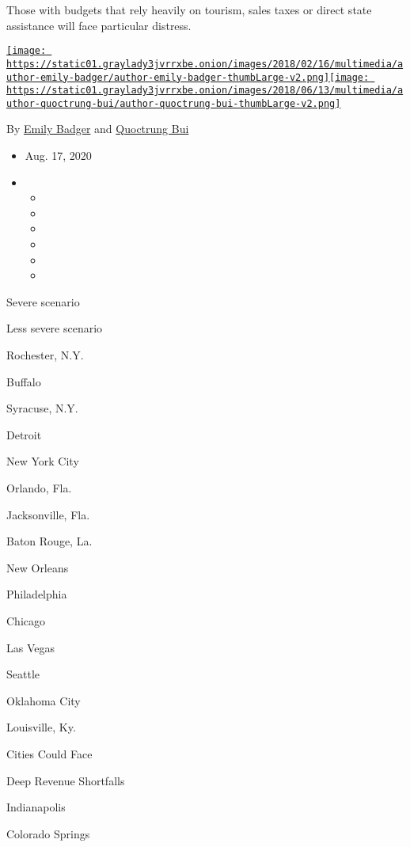 Those with budgets that rely heavily on tourism, sales taxes or direct
state assistance will face particular distress.

\href{https://www.nytimes3xbfgragh.onion/by/emily-badger}{\texttt{[image: https://static01.graylady3jvrrxbe.onion/images/2018/02/16/multimedia/author-emily-badger/author-emily-badger-thumbLarge-v2.png]}}\href{https://www.nytimes3xbfgragh.onion/by/quoctrung-bui}{\texttt{[image: https://static01.graylady3jvrrxbe.onion/images/2018/06/13/multimedia/author-quoctrung-bui/author-quoctrung-bui-thumbLarge-v2.png]}}

By \href{https://www.nytimes3xbfgragh.onion/by/emily-badger}{Emily
Badger} and
\href{https://www.nytimes3xbfgragh.onion/by/quoctrung-bui}{Quoctrung
Bui}

\begin{itemize}
\item
  Aug. 17, 2020
\item
  \begin{itemize}
  \item
  \item
  \item
  \item
  \item
  \item
  \end{itemize}
\end{itemize}

Severe scenario

Less severe scenario

Rochester, N.Y.

Buffalo

Syracuse, N.Y.

Detroit

New York City

Orlando, Fla.

Jacksonville, Fla.

Baton Rouge, La.

New Orleans

Philadelphia

Chicago

Las Vegas

Seattle

Oklahoma City

Louisville, Ky.

Cities Could Face

Deep Revenue Shortfalls

Indianapolis

Colorado Springs

